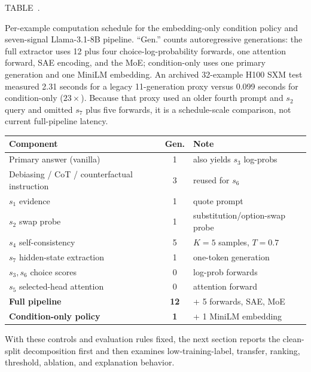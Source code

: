 \documentclass{ieeeaccess}
\newcommand{\inlinetablecaption}[2]{%
  \par\vspace{0.62\baselineskip}\noindent
  \refstepcounter{table}\label{#1}%
  {\color{accessblue}\tablecapheadfont TABLE~\thetable.\ }%
  {\tablecapfont #2\par}%
  \vspace{6pt}%
}
\begin{document}
\noindent\begin{minipage}{\columnwidth}
\inlinetablecaption{tab:cost}{Per-example computation schedule for the embedding-only condition policy and seven-signal Llama-3.1-8B pipeline. ``Gen.'' counts autoregressive generations: the full extractor uses 12 plus four choice-log-probability forwards, one attention forward, SAE encoding, and the MoE; condition-only uses one primary generation and one MiniLM embedding. An archived 32-example H100 SXM test measured 2.31 seconds for a legacy 11-generation proxy versus 0.099 seconds for condition-only ($23\times$). Because that proxy used an older fourth prompt and $s_2$ query and omitted $s_7$ plus five forwards, it is a schedule-scale comparison, not current full-pipeline latency.}
\begin{center}
\footnotesize
\setlength{\tabcolsep}{2pt}
\begin{tabular}{@{}>{\raggedright\arraybackslash}p{}c>{\raggedright\arraybackslash}p{}@{}}
\toprule
Component & Gen. & Note \\
\midrule
Primary answer (vanilla) & 1 & also yields $s_3$ log-probs \\
Debiasing / CoT / counterfactual instruction & 3 & reused for $s_6$ \\
$s_1$ evidence & 1 & quote prompt \\
$s_2$ swap probe & 1 & substitution/option-swap probe \\
$s_4$ self-consistency & 5 & $K{=}5$ samples, $T{=}0.7$ \\
$s_7$ hidden-state extraction & 1 & one-token generation \\
$s_3,s_6$ choice scores & 0 & 4 log-prob forwards \\
$s_5$ selected-head attention & 0 & 1 attention forward \\
\midrule
\textbf{Full pipeline} & \textbf{12} & + 5 forwards, SAE, MoE \\
\textbf{Condition-only policy} & \textbf{1} & + 1 MiniLM embedding \\
\bottomrule
\end{tabular}
\end{center}
\end{minipage}
\par\vspace{0.5\baselineskip}

With these controls and evaluation rules fixed, the next section reports the clean-split decomposition first and then examines low-training-label, transfer, ranking, threshold, ablation, and explanation behavior.
\end{document}
